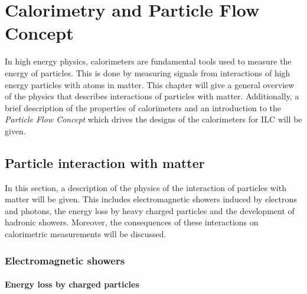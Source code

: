 \chapter{Calorimetry and Particle Flow Concept}

In high energy physics, calorimeters are fundamental tools used to measure the energy of particles. This is done by measuring signals from interactions of high energy particles with atoms in matter. This chapter will give a general overview of the physics that describes interactions of particles with matter. Additionally, a brief description of the properties of calorimeters and an introduction to the \textit{Particle Flow Concept} which drives the designs of the calorimeters for ILC will be given.

\section{Particle interaction with matter}
\label{sec:PartInter}

In this section, a description of the physics of the interaction of particles with matter will be given. This includes electromagnetic showers induced by electrons and photons, the energy loss by heavy charged particles and the development of hadronic showers. Moreover, the consequences of these interactions on calorimetric measurements will be discussed.

\subsection{Electromagnetic showers}
\label{subsec:EMShowers}

\subsubsection{Energy loss by charged particles}

